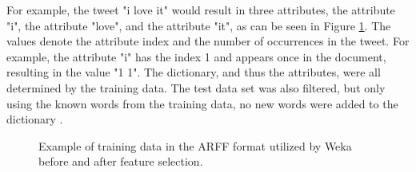 For example, the tweet "i love it" would result in three attributes, the attribute "i", the attribute "love", and the attribute "it", as can be seen in Figure \ref{fig:arff_train}. The values denote the attribute index and the number of occurrences in the tweet. For example, the attribute "i" has the index 1 and appears once in the document, resulting in the value "1 1". The dictionary, and thus the attributes, were all determined by the training data. The test data set was also filtered, but only using the known words from the training data, no new words were added to the dictionary \cite{Weka}.

\begin{figure}
    \centering
{}
\vspace{1mm}
    \caption{Example of training data in the ARFF format utilized by Weka before and after feature selection.}
    \label{fig:arff_train}
\end{figure}

